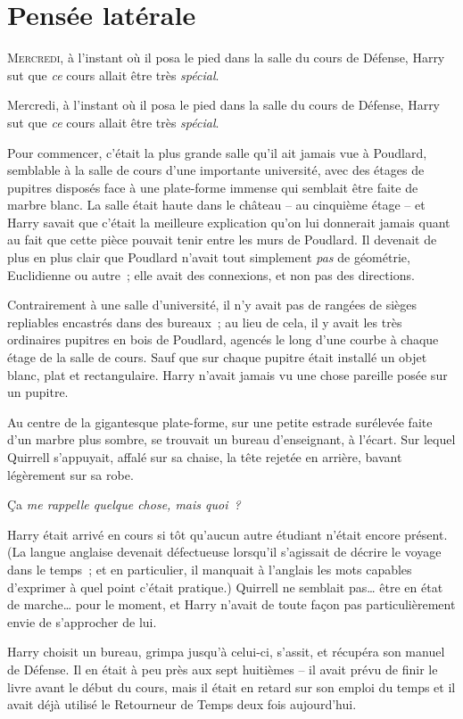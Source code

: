 \chapter{Pensée latérale}

\lettrine{M}{ercredi,} à l'instant où il posa le pied dans la salle du cours de Défense, Harry sut que \emph{ce} cours allait être très \emph{spécial}.

Mercredi, à l'instant où il posa le pied dans la salle du cours de Défense, Harry sut que \emph{ce} cours allait être très \emph{spécial}.

Pour commencer, c'était la plus grande salle qu'il ait jamais vue à Poudlard, semblable à la salle de cours d'une importante université, avec des étages de pupitres disposés face à une plate-forme immense qui semblait être faite de marbre blanc. La salle était haute dans le château -- au cinquième étage -- et Harry savait que c'était la meilleure explication qu'on lui donnerait jamais quant au fait que cette pièce pouvait tenir entre les murs de Poudlard. Il devenait de plus en plus clair que Poudlard n'avait tout simplement \emph{pas} de géométrie, Euclidienne ou autre~; elle avait des connexions, et non pas des directions.

Contrairement à une salle d'université, il n'y avait pas de rangées de sièges repliables encastrés dans des bureaux~; au lieu de cela, il y avait les très ordinaires pupitres en bois de Poudlard, agencés le long d'une courbe à chaque étage de la salle de cours. Sauf que sur chaque pupitre était installé un objet blanc, plat et rectangulaire. Harry n'avait jamais vu une chose pareille posée sur un pupitre.

Au centre de la gigantesque plate-forme, sur une petite estrade surélevée faite d'un marbre plus sombre, se trouvait un bureau d'enseignant, à l'écart. Sur lequel Quirrell s'appuyait, affalé sur sa chaise, la tête rejetée en arrière, bavant légèrement sur sa robe.

Ça \emph{me rappelle quelque chose, mais quoi~?}

Harry était arrivé en cours si tôt qu'aucun autre étudiant n'était encore présent. (La langue anglaise devenait défectueuse lorsqu'il s'agissait de décrire le voyage dans le temps~; et en particulier, il manquait à l'anglais les mots capables d'exprimer à quel point c'était pratique.) Quirrell ne semblait pas… être en état de marche… pour le moment, et Harry n'avait de toute façon pas particulièrement envie de s'approcher de lui.

Harry choisit un bureau, grimpa jusqu'à celui-ci, s'assit, et récupéra son manuel de Défense. Il en était à peu près aux sept huitièmes -- il avait prévu de finir le livre avant le début du cours, mais il était en retard sur son emploi du temps et il avait déjà utilisé le Retourneur de Temps deux fois aujourd'hui.

